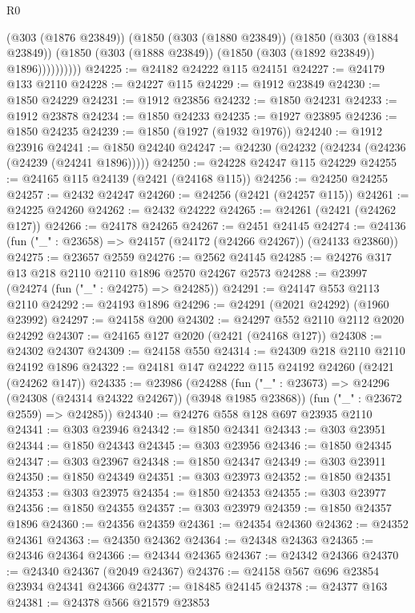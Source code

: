 \begin{lexlean}{R0}
\begin{coremodule}
                (@303 (@1876 @23849))
                (@1850
                  (@303 (@1880 @23849))
                  (@1850
                    (@303 (@1884 @23849))
                    (@1850 (@303 (@1888 @23849)) (@1850 (@303 (@1892 @23849)) @1896))))))))))
@24225 := @24182 @24222 @115 @24151
@24227 := @24179 @133 @2110
@24228 := @24227 @115
@24229 := @1912 @23849
@24230 := @1850 @24229
@24231 := @1912 @23856
@24232 := @1850 @24231
@24233 := @1912 @23878
@24234 := @1850 @24233
@24235 := @1927 @23895
@24236 := @1850 @24235
@24239 := @1850 (@1927 (@1932 @1976))
@24240 := @1912 @23916
@24241 := @1850 @24240
@24247 := @24230 (@24232 (@24234 (@24236 (@24239 (@24241 @1896)))))
@24250 := @24228 @24247 @115 @24229
@24255 := @24165 @115 @24139 (@2421 (@24168 @115))
@24256 := @24250 @24255
@24257 := @2432 @24247
@24260 := @24256 (@2421 (@24257 @115))
@24261 := @24225 @24260
@24262 := @2432 @24222
@24265 := @24261 (@2421 (@24262 @127))
@24266 := @24178 @24265
@24267 := @2451 @24145
@24274 := @24136 (fun ("_" : @23658) => @24157 (@24172 (@24266 @24267)) (@24133 @23860))
@24275 := @23657 @2559
@24276 := @2562 @24145
@24285 := @24276 @317 @13 @218 @2110 @2110 @1896 @2570 @24267 @2573
@24288 := @23997 (@24274 (fun ("_" : @24275) => @24285))
@24291 := @24147 @553 @2113 @2110
@24292 := @24193 @1896
@24296 := @24291 (@2021 @24292) (@1960 @23992)
@24297 := @24158 @200
@24302 := @24297 @552 @2110 @2112 @2020 @24292
@24307 := @24165 @127 @2020 (@2421 (@24168 @127))
@24308 := @24302 @24307
@24309 := @24158 @550
@24314 := @24309 @218 @2110 @2110 @24192 @1896
@24322 := @24181 @147 @24222 @115 @24192 @24260 (@2421 (@24262 @147))
@24335 := @23986
    (@24288
      (fun ("_" : @23673) => @24296 (@24308 (@24314 @24322 @24267)) (@3948 @1985 @23868))
      (fun ("_" : @23672 @2559) => @24285))
@24340 := @24276 @558 @128 @697 @23935 @2110
@24341 := @303 @23946
@24342 := @1850 @24341
@24343 := @303 @23951
@24344 := @1850 @24343
@24345 := @303 @23956
@24346 := @1850 @24345
@24347 := @303 @23967
@24348 := @1850 @24347
@24349 := @303 @23911
@24350 := @1850 @24349
@24351 := @303 @23973
@24352 := @1850 @24351
@24353 := @303 @23975
@24354 := @1850 @24353
@24355 := @303 @23977
@24356 := @1850 @24355
@24357 := @303 @23979
@24359 := @1850 @24357 @1896
@24360 := @24356 @24359
@24361 := @24354 @24360
@24362 := @24352 @24361
@24363 := @24350 @24362
@24364 := @24348 @24363
@24365 := @24346 @24364
@24366 := @24344 @24365
@24367 := @24342 @24366
@24370 := @24340 @24367 (@2049 @24367)
@24376 := @24158 @567 @696 @23854 @23934 @24341 @24366
@24377 := @18485 @24145
@24378 := @24377 @163
@24381 := @24378 @566 @21579 @23853

\end{coremodule}
\end{lexlean}
